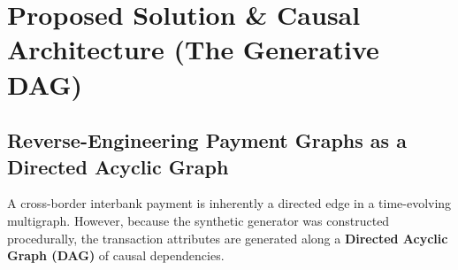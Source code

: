 \documentclass[11pt,a4paper]{article}
\begin{document}
\section{Proposed Solution \& Causal Architecture (The Generative DAG)}

\subsection{Reverse-Engineering Payment Graphs as a Directed Acyclic Graph}
A cross-border interbank payment is inherently a directed edge in a time-evolving multigraph. However, because the synthetic generator was constructed procedurally, the transaction attributes are generated along a \textbf{Directed Acyclic Graph (DAG)} of causal dependencies.
\end{document}
